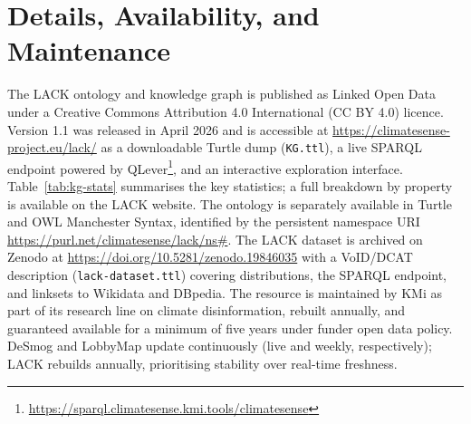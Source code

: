 \section{Details, Availability, and Maintenance}
\label{sec:resource}
\begin{sloppypar}The LACK ontology and knowledge graph is published as Linked Open Data under a Creative Commons Attribution 4.0 International (CC BY 4.0) licence. Version 1.1 was released in April 2026 and is accessible at \url{https://climatesense-project.eu/lack/} as a downloadable Turtle dump (\texttt{KG.ttl}), a live SPARQL endpoint powered by QLever\footnote{\url{https://sparql.climatesense.kmi.tools/climatesense}}, and an interactive exploration interface. 
Table~\ref{tab:kg-stats} summarises the key statistics; a full breakdown by property is available on the LACK website. 
The ontology is separately available in Turtle and OWL Manchester Syntax, identified by the persistent namespace URI \url{https://purl.net/climatesense/lack/ns#}. The LACK %
dataset is archived on Zenodo at \url{https://doi.org/10.5281/zenodo.19846035} with a VoID/DCAT description (\texttt{lack-dataset.ttl}) covering distributions, the SPARQL endpoint, and linksets to Wikidata and DBpedia. 
The resource is maintained by KMi as part of its research line on climate disinformation, rebuilt annually, and guaranteed available for a minimum of five years under funder open data policy.
DeSmog and LobbyMap update continuously (live and weekly, respectively); LACK rebuilds annually, prioritising stability over real-time freshness.
\end{sloppypar}
